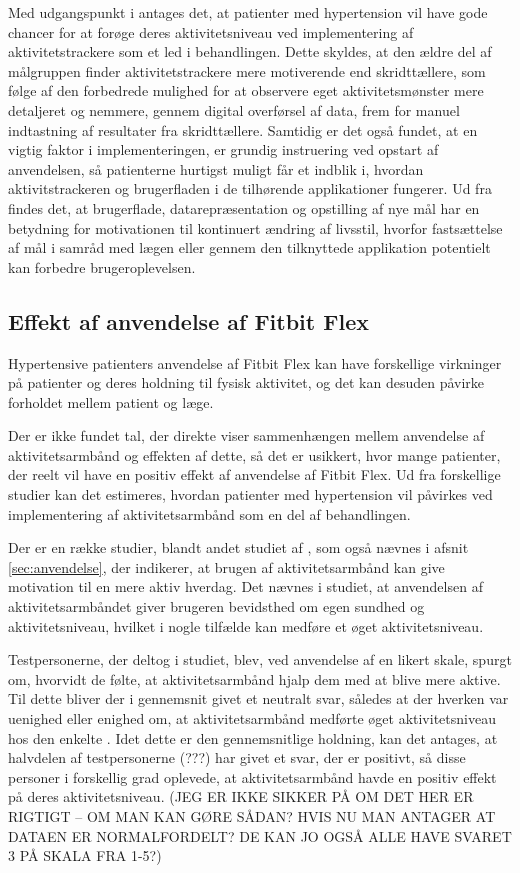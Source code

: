 Med udgangspunkt i \citeauthor{mercer2016} antages det, at patienter med hypertension vil have gode chancer for at forøge deres aktivitetsniveau ved implementering af aktivitetstrackere som et led i behandlingen. Dette skyldes, at den ældre del af målgruppen finder aktivitetstrackere mere motiverende end skridttællere, som følge af den forbedrede mulighed for at observere eget aktivitetsmønster mere detaljeret og nemmere, gennem digital overførsel af data, frem for manuel indtastning af resultater fra skridttællere. Samtidig er det også fundet, at en vigtig faktor i implementeringen, er grundig instruering ved opstart af anvendelsen, så patienterne hurtigst muligt får et indblik i, hvordan aktivitstrackeren og brugerfladen i de tilhørende applikationer fungerer. Ud fra \citeauthor{rapp2016} findes det, at brugerflade, datarepræsentation og opstilling af nye mål har en betydning for motivationen til kontinuert ændring af livsstil, hvorfor fastsættelse af mål i samråd med lægen eller gennem den tilknyttede applikation potentielt kan forbedre brugeroplevelsen.


\subsection{Effekt af anvendelse af Fitbit Flex}
Hypertensive patienters anvendelse af Fitbit Flex kan have forskellige virkninger på patienter og deres holdning til fysisk aktivitet, og det kan desuden påvirke forholdet mellem patient og læge.

Der er ikke fundet tal, der direkte viser sammenhængen mellem anvendelse af aktivitetsarmbånd og effekten af dette, så det er usikkert, hvor mange patienter, der reelt vil have en positiv effekt af anvendelse af Fitbit Flex. Ud fra forskellige studier kan det estimeres, hvordan patienter med hypertension vil påvirkes ved implementering af aktivitetsarmbånd som en del af behandlingen.

Der er en række studier, blandt andet studiet af \cite{mercer2016}, som også nævnes i afsnit \autoref{sec:anvendelse}, der indikerer, at brugen af aktivitetsarmbånd kan give motivation til en mere aktiv hverdag. Det nævnes i studiet, at anvendelsen af aktivitetsarmbåndet giver brugeren bevidsthed om egen sundhed og aktivitetsniveau, hvilket i nogle tilfælde kan medføre et øget aktivitetsniveau. 

Testpersonerne, der deltog i studiet, blev, ved anvendelse af en likert skale, spurgt om, hvorvidt de følte, at aktivitetsarmbånd hjalp dem med at blive mere aktive. Til dette bliver der i gennemsnit givet et neutralt svar, således at der hverken var uenighed eller enighed om, at aktivitetsarmbånd medførte øget aktivitetsniveau hos den enkelte \citep{merver2016}. Idet dette er den gennemsnitlige holdning, kan det antages, at halvdelen af testpersonerne (???) har givet et svar, der er positivt, så disse personer i forskellig grad oplevede, at aktivitetsarmbånd havde en positiv effekt på deres aktivitetsniveau. (JEG ER IKKE SIKKER PÅ OM DET HER ER RIGTIGT – OM MAN KAN GØRE SÅDAN?  HVIS NU MAN ANTAGER AT DATAEN ER NORMALFORDELT? DE KAN JO OGSÅ ALLE HAVE SVARET 3 PÅ SKALA FRA 1-5?)

